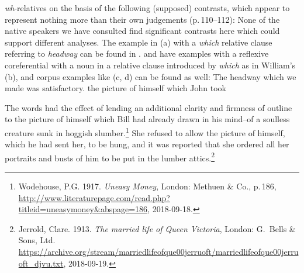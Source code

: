 \documentclass[output=paper
	        ,collection
	        ,collectionchapter
 	        ,biblatex
                ,babelshorthands
                ,newtxmath
                ,draftmode
                ,colorlinks, citecolor=brown
]{langscibook}
\begin{document}
\emph{wh}-relatives on the basis of the following (supposed) contrasts, which appear to represent
nothing more than their own judgements (p.\,110--112):
\eal
{}
\label{ex:min-headway-that}
\label{ex:min-headway-which}
\zl
\eal
{}
\label{ex:min-admire-that}
\label{ex:min-admire-which} 
\zl
\eal
{}
\label{ex:min-picture-that}
\label{ex:min-picture-which} 
\zl
None of the native speakers we have consulted find significant contrasts here which could support
different analyses. The example in (a) with a \emph{which} relative clause referring to \emph{headway} can be found in
.  and  have examples
with a reflexive coreferential with a noun in a relative clause introduced by \emph{which} as in
William's (b), and corpus examples like (c, d) can be found as well:
\ealnoraggedright
\ex The headway which we made was satisfactory.
\ex the picture of himself which John took

\ex The words had the effect of lending an additional clarity and firmness of outline to the picture
    of himself which Bill had already drawn in his mind--of a soulless creature sunk in hoggish
    slumber.\footnote{
      Wodehouse, P.G. 1917. \emph{Uneasy Money}, London: Methuen \& Co., p.\,186,
      \url{http://www.literaturepage.com/read.php?titleid=uneasymoney&abspage=186},
      2018-09-18.
}
\ex She refused to allow the 
picture of himself, which he had sent her, to be hung, 
and it was reported that she ordered all her portraits 
and busts of him to be put in the lumber attics.\footnote{
 Jerrold, Clare. 1913. \emph{The married life of Queen Victoria}, London: G.\ Bells \& Sons, Ltd.
 \url{https://archive.org/stream/marriedlifeofque00jerruoft/marriedlifeofque00jerruoft_djvu.txt}, 2018-09-19.
}
\end{document}
